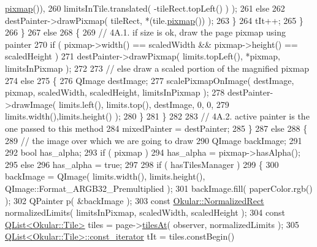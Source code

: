\begin{DoxyCode}
      \hyperlink{classOkular_1_1Tile_ad20431332cb0fb2844fa2238cc728a9f}{pixmap}()),
260                                 limitsInTile.translated( -tileRect.topLeft() ) );
261                     \textcolor{keywordflow}{else}
262                         destPainter->drawPixmap( tileRect, *(tile.\hyperlink{classOkular_1_1Tile_ad20431332cb0fb2844fa2238cc728a9f}{pixmap}()) );
263                 \}
264                 tIt++;
265             \}
266         \}
267         \textcolor{keywordflow}{else}
268         \{
269             \textcolor{comment}{// 4A.1. if size is ok, draw the page pixmap using painter}
270             \textcolor{keywordflow}{if} ( pixmap->width() == scaledWidth && pixmap->height() == scaledHeight )
271                 destPainter->drawPixmap( limits.topLeft(), *pixmap, limitsInPixmap );
272 
273             \textcolor{comment}{// else draw a scaled portion of the magnified pixmap}
274             \textcolor{keywordflow}{else}
275             \{
276                 QImage destImage;
277                 scalePixmapOnImage( destImage, pixmap, scaledWidth, scaledHeight, limitsInPixmap );
278                 destPainter->drawImage( limits.left(), limits.top(), destImage, 0, 0,
279                                          limits.width(),limits.height() );
280             \}
281         \}
282 
283         \textcolor{comment}{// 4A.2. active painter is the one passed to this method}
284         mixedPainter = destPainter;
285     \}
287     \textcolor{keywordflow}{else}
288     \{
289         \textcolor{comment}{// the image over which we are going to draw}
290         QImage backImage;
291 
292         \textcolor{keywordtype}{bool} has\_alpha;
293         \textcolor{keywordflow}{if} ( pixmap )
294             has\_alpha = pixmap->hasAlpha();
295         \textcolor{keywordflow}{else}
296             has\_alpha = \textcolor{keyword}{true};
297 
298         \textcolor{keywordflow}{if} ( hasTilesManager )
299         \{
300             backImage = QImage( limits.width(), limits.height(), QImage::Format\_ARGB32\_Premultiplied );
301             backImage.fill( paperColor.rgb() );
302             QPainter p( &backImage );
303             \textcolor{keyword}{const} \hyperlink{classOkular_1_1NormalizedRect}{Okular::NormalizedRect} normalizedLimits( limitsInPixmap, 
      scaledWidth, scaledHeight );
304             \textcolor{keyword}{const} \hyperlink{classQList}{QList<Okular::Tile>} tiles = page->\hyperlink{classOkular_1_1Page_a5dea3e142724e8c320b50bba420bd03b}{tilesAt}( observer, 
      normalizedLimits );
305             \hyperlink{classQList}{QList<Okular::Tile>::const\_iterator} tIt = tiles.constBegin()

\end{DoxyCode}
